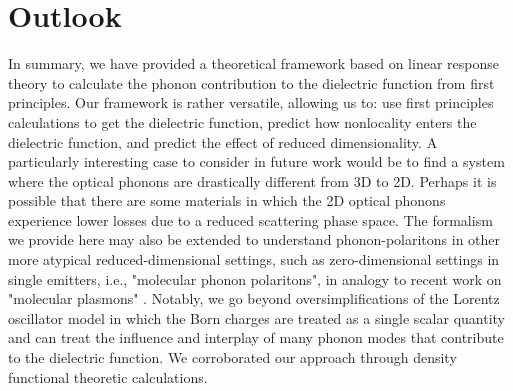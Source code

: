 \documentclass[superscriptaddress,reprint,prb]{revtex4-1}
\begin{document}








\section{Outlook}

In summary, we have provided a theoretical framework based on linear response theory to calculate the phonon contribution to the dielectric function from first principles. Our framework is rather versatile, allowing us to: use first principles calculations to get the dielectric function, predict how nonlocality enters the dielectric function, and predict the effect of reduced dimensionality. A particularly interesting case to consider in future work would be to find a system where the optical phonons are drastically different from 3D to 2D. Perhaps it is possible that there are some materials in which the 2D optical phonons experience lower losses due to a reduced scattering phase space. The formalism we provide here may also be extended to understand phonon-polaritons in other more atypical reduced-dimensional settings, such as zero-dimensional settings in single emitters, i.e., "molecular phonon polaritons", in analogy to recent work on "molecular plasmons" \cite{manjavacas2013tunable,lauchner2015molecular}. Notably, we go beyond oversimplifications of the Lorentz oscillator model in which the Born charges are treated as a single scalar quantity and can treat the influence and interplay of many phonon modes that contribute to the dielectric function. We corroborated our approach through density functional theoretic calculations.
\end{document}
